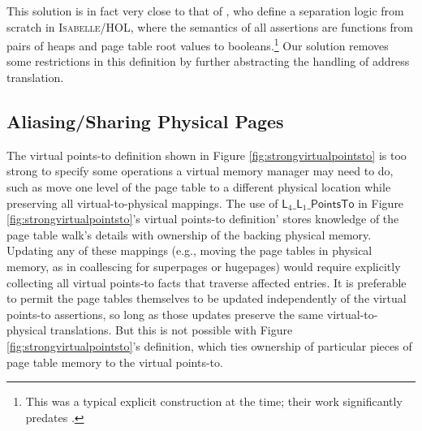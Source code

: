 This solution is in fact very close to that of \citet{kolanski08vstte}, who define a separation logic from scratch in \textsc{Isabelle/HOL},
where the semantics of all assertions are functions from pairs of heaps and page table root values to booleans.\footnote{
  This was a typical explicit construction at the time; their work significantly predates \iris.
}
Our solution removes some restrictions in this definition by further abstracting the handling of address translation.

\subsection{Aliasing/Sharing Physical Pages}
  \label{sec:sharingpages}  
  The virtual points-to definition shown in Figure \ref{fig:strongvirtualpointsto} 
  is too strong to specify some operations a virtual memory manager may need to do, such as
  move one level of the page table to a different physical location while preserving all virtual-to-physical mappings. %
  The use of $\textsf{L}_{4}\_\textsf{L}_{1}\_\textsf{PointsTo}$ in Figure \ref{fig:strongvirtualpointsto}'s
  virtual points-to definition'
   stores knowledge of the page table walk's details with ownership of the backing physical
  memory.
  Updating any of these mappings (e.g., moving the page tables in physical memory, as in coallescing for
  superpages or hugepages)
  would require explicitly collecting all virtual points-to facts that traverse affected entries.
  It is preferable to permit the page tables themselves to be updated independently of the virtual points-to assertions,
  so long as those updates preserve the same virtual-to-physical translations.
  But this is not possible with Figure \ref{fig:strongvirtualpointsto}'s definition, which ties ownership of particular
  pieces of page table memory to the virtual points-to.


  \newcommand{\ghostmaptoken}[3]{\ensuremath{#2\hookrightarrow^{#1}#3}}
  \newcommand{\fracghostmaptoken}[4]{\ensuremath{#2\hookrightarrow^{#1}_{#4}#3}}

